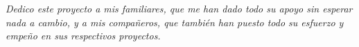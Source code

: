 
\thispagestyle{empty}
{}

\hfill
\vfill

\begin{flushright}
\itshape
Dedico este proyecto a mis familiares, que me han dado todo su apoyo sin esperar nada a cambio, y a mis compañeros, que también han puesto todo su esfuerzo y empeño en sus respectivos proyectos.
\end{flushright}

\vfill

\cleardoublepage
\endinput
